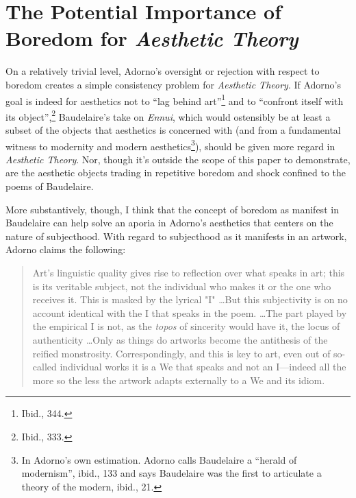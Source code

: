 \documentclass[12pt]{article}
\begin{document}
\section{The Potential Importance of Boredom for \textit{Aesthetic Theory}}
On a relatively trivial level, Adorno's oversight or rejection with respect to boredom creates a simple consistency problem for \textit{Aesthetic Theory}. If Adorno's goal is indeed for aesthetics not to ``lag behind art''\footnote{Ibid., 344.} and to ``confront itself with its object'',\footnote{Ibid., 333.} Baudelaire's take on \textit{Ennui}, which would ostensibly be at least a subset of the objects that aesthetics is concerned with (and from a fundamental witness to modernity and modern aesthetics\footnote{In Adorno's own estimation. Adorno calls Baudelaire a ``herald of modernism'', ibid., 133 and says Baudelaire was the first to articulate a theory of the modern, ibid., 21.}), should be given more regard in \textit{Aesthetic Theory}. Nor, though it's outside the scope of this paper to demonstrate, are the aesthetic objects trading in repetitive boredom and shock confined to the poems of Baudelaire.  

More substantively, though, I think that the concept of boredom as manifest in Baudelaire can help solve an aporia in Adorno's aesthetics that centers on the nature of subjecthood. With regard to subjecthood as it manifests in an artwork, Adorno claims the following:  

\begin{quote}
\begin{singlespace}
Art's linguistic quality gives rise to reflection over what speaks in art; this is its veritable subject, not the individual who makes it or the one who receives it. This is masked by the lyrical "I" \dots  But this subjectivity is on no account identical with the I that speaks in the poem. \dots  The part played by the empirical I is not, as the \textit{topos} of sincerity would have it, the locus of authenticity \dots  Only as things do artworks become the antithesis of the reified monstrosity. Correspondingly, and this is key to art, even out of so-called individual works it is a We that speaks and not an I---indeed all the more so the less the artwork adapts externally to a We and its idiom.
\end{singlespace}
\end{quote}
\end{document}
